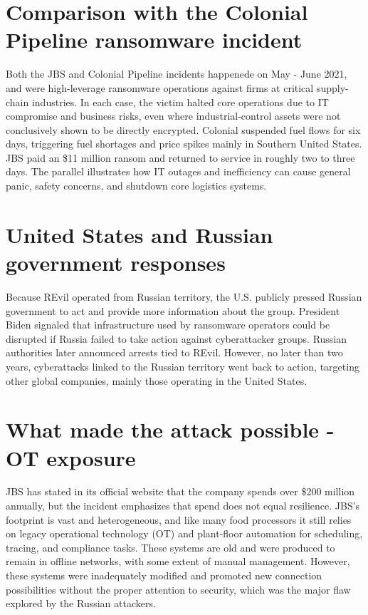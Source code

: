 \documentclass[conference]{IEEEtran}
\begin{document}
\section{Comparison with the Colonial Pipeline ransomware incident}
Both the JBS and Colonial Pipeline incidents happenede on May - June 2021, and were high-leverage ransomware operations against firms at critical supply-chain industries. In each case, the victim halted core operations due to IT compromise and business risks, even where industrial-control assets were not conclusively shown to be directly encrypted. Colonial suspended fuel flows for six days, triggering fuel shortages and price spikes mainly in Southern United States. JBS paid an \$11 million ransom and returned to service in roughly two to three days. The parallel illustrates how IT outages and inefficiency can cause general panic, safety concerns, and shutdown core logistics systems.

\section{United States and Russian government responses}
Because REvil operated from Russian territory, the U.S. publicly pressed Russian government to act and provide more information about the group. President Biden signaled that infrastructure used by ransomware operators could be disrupted if Russia failed to take action against cyberattacker groups. Russian authorities later announced arrests tied to REvil. However, no later than two years, cyberattacks linked to the Russian territory went back to action, targeting other global companies, mainly those operating in the United States.

\section{What made the attack possible - OT exposure}
JBS has stated in its official website that the company spends over \$200 million annually, but the incident emphasizes that spend does not equal resilience. JBS's footprint is vast and heterogeneous, and like many food processors it still relies on legacy operational technology (OT) and plant-floor automation for scheduling, tracing, and compliance tasks. These systems are old and were produced to remain in offline networks, with some extent of manual management. However, these systems were inadequately modified and promoted new connection possibilities without the proper attention to security, which was the major flaw explored by the Russian attackers. 
\end{document}
